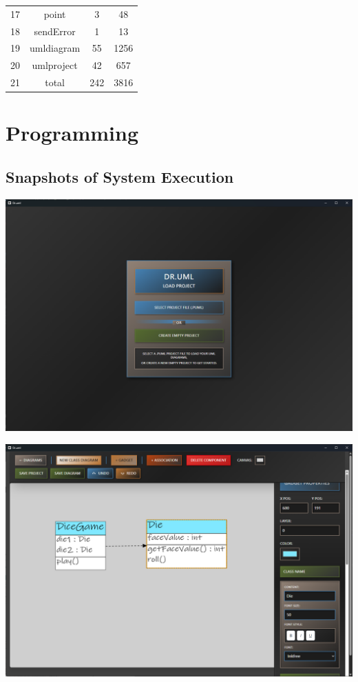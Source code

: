 \documentclass[12pt]{article}
\begin{document}
\begin{longtable}{|c|c|c|c|}
        17 & point                & 3                 & 48                    \\ %
        18 & sendError            & 1                 & 13                    \\ %
        19 & umldiagram           & 55                & 1256                  \\ %
        20 & umlproject           & 42                & 657                   \\ %
        21 & total                & 242               & 3816                  \\
        \hline
    \end{longtable}


    \section{Programming}

    \subsection{Snapshots of System Execution}
    \begin{center}
        \includegraphics[width=0.95\linewidth]
        {assets/hw7/exe1.png}
    \end{center}

    \begin{center}
        \includegraphics[width=0.95\linewidth]
        {assets/hw7/exe2.png}
    \end{center}
\end{document}
